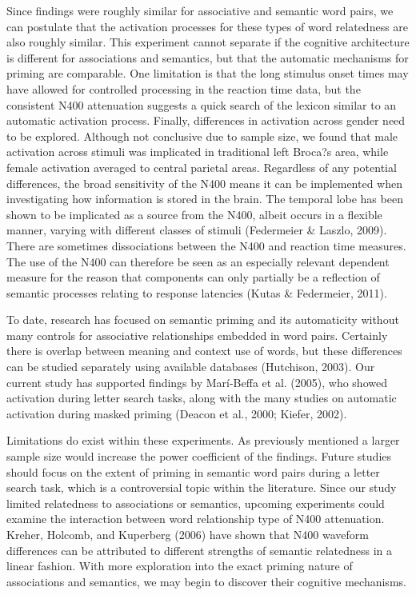 \documentclass[english,man]{apa6}
\theoremstyle{definition}
\theoremstyle{definition}
\theoremstyle{definition}
\theoremstyle{remark}
\begin{document}
Since findings were roughly similar for associative and semantic word
pairs, we can postulate that the activation processes for these types of
word relatedness are also roughly similar. This experiment cannot
separate if the cognitive architecture is different for associations and
semantics, but that the automatic mechanisms for priming are comparable.
One limitation is that the long stimulus onset times may have allowed
for controlled processing in the reaction time data, but the consistent
N400 attenuation suggests a quick search of the lexicon similar to an
automatic activation process. Finally, differences in activation across
gender need to be explored. Although not conclusive due to sample size,
we found that male activation across stimuli was implicated in
traditional left Broca?s area, while female activation averaged to
central parietal areas. Regardless of any potential differences, the
broad sensitivity of the N400 means it can be implemented when
investigating how information is stored in the brain. The temporal lobe
has been shown to be implicated as a source from the N400, albeit occurs
in a flexible manner, varying with different classes of stimuli
(Federmeier \& Laszlo, 2009). There are sometimes dissociations between
the N400 and reaction time measures. The use of the N400 can therefore
be seen as an especially relevant dependent measure for the reason that
components can only partially be a reflection of semantic processes
relating to response latencies (Kutas \& Federmeier, 2011).

To date, research has focused on semantic priming and its automaticity
without many controls for associative relationships embedded in word
pairs. Certainly there is overlap between meaning and context use of
words, but these differences can be studied separately using available
databases (Hutchison, 2003). Our current study has supported findings by
Marí-Beffa et al. (2005), who showed activation during letter search
tasks, along with the many studies on automatic activation during masked
priming (Deacon et al., 2000; Kiefer, 2002).

Limitations do exist within these experiments. As previously mentioned a
larger sample size would increase the power coefficient of the findings.
Future studies should focus on the extent of priming in semantic word
pairs during a letter search task, which is a controversial topic within
the literature. Since our study limited relatedness to associations or
semantics, upcoming experiments could examine the interaction between
word relationship type of N400 attenuation. Kreher, Holcomb, and
Kuperberg (2006) have shown that N400 waveform differences can be
attributed to different strengths of semantic relatedness in a linear
fashion. With more exploration into the exact priming nature of
associations and semantics, we may begin to discover their cognitive
mechanisms.
\end{document}
